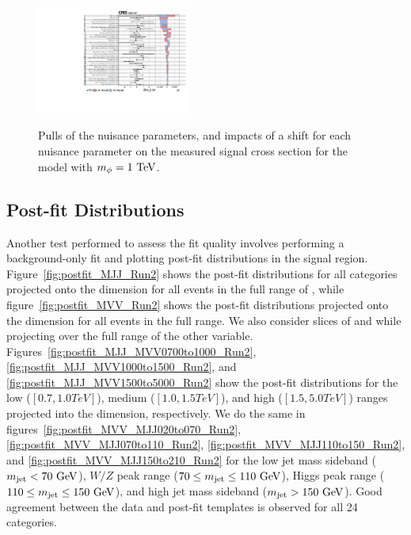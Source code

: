 \begin{figure}[htbp]
  \includegraphics[width=0.45\textwidth,page=6]{fig/fitValidation/impacts_VBFRadToWW1000_6p_72.pdf}\\
  \caption{
    Pulls of the nuisance parameters, and impacts of a shift for each nuisance parameter on the measured signal cross section for the \VBF\RadtoWW model with $m_{\Rad}=1\unit{TeV}$.
  }
  \label{fig:impacts_VBFRadToWW}
\end{figure}

\subsection{Post-fit Distributions}

Another test performed to assess the fit quality involves performing a background-only fit and plotting post-fit distributions in the signal region.
Figure~\ref{fig:postfit_MJJ_Run2} shows the post-fit distributions for all categories projected onto the \MJ dimension for all events in the full range of \MVV, while figure~\ref{fig:postfit_MVV_Run2} shows the post-fit distributions projected onto the \MVV dimension for all events in the full \MJ range.
We also consider slices of \MJ and \MVV while projecting over the full range of the other variable.
Figures~\ref{fig:postfit_MJJ_MVV0700to1000_Run2}, \ref{fig:postfit_MJJ_MVV1000to1500_Run2}, and \ref{fig:postfit_MJJ_MVV1500to5000_Run2} show the post-fit distributions for the low ($[0.7,1.0\unit{TeV}]$), medium ($[1.0,1.5\unit{TeV}]$), and high ($[1.5,5.0\unit{TeV}]$) \MVV ranges projected into the \MJ dimension, respectively.
We do the same in figures~\ref{fig:postfit_MVV_MJJ020to070_Run2}, \ref{fig:postfit_MVV_MJJ070to110_Run2}, \ref{fig:postfit_MVV_MJJ110to150_Run2}, and \ref{fig:postfit_MVV_MJJ150to210_Run2} for the low jet mass sideband ($\MJ<70\unit{GeV}$), $W/Z$ peak range ($70\leq\MJ\leq110\unit{GeV}$), Higgs peak range ($110\leq\MJ\leq150\unit{GeV}$), and high jet mass sideband ($\MJ>150\unit{GeV}$).
Good agreement between the data and post-fit templates is observed for all 24 categories.

